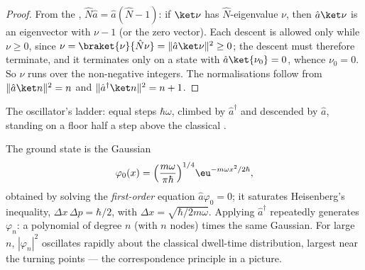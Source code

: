 \begin{proof}
From the , $\hat N\hat a = \hat a(\hat N - 1)$: if
$\ket\nu$ has $\hat N$-eigenvalue $\nu$, then $\hat a\ket\nu$ is an
eigenvector with $\nu - 1$ (or the zero vector). Each descent is
allowed only while $\nu \ge 0$, since $\nu = \braket{\nu}{\hat
N\nu} = \|\hat a\ket\nu\|^2 \ge 0$; the descent must therefore
terminate, and it terminates only on a state with $\hat a\ket{\nu_0}
= 0$, whence $\nu_0 = 0$. So $\nu$ runs over the non-negative
integers. The normalisations follow from $\|\hat a\ket n\|^2 = n$
and $\|\hat a^\dagger\ket n\|^2 = n + 1$.
\end{proof}

\begin{omfigure}

{\small The oscillator's ladder: equal steps $\hbar\omega$, climbed
by $\hat a^\dagger$ and descended by $\hat a$, standing on a floor
half a step above the classical .}
\end{omfigure}

\begin{proposition}\label{prop:b3:harmonic-oscillator:wavefunctions}
The ground state is the Gaussian
\[
\varphi_0(x) = \Big(\frac{m\omega}{\pi\hbar}\Big)^{1/4}
\eu^{-m\omega x^2/2\hbar} ,
\]
obtained by solving the \emph{first-order} equation $\hat a\varphi_0
= 0$; it saturates Heisenberg's inequality, $\Delta x\,\Delta p =
\hbar/2$, with $\Delta x = \sqrt{\hbar/2m\omega}$. Applying
$\hat a^\dagger$ repeatedly generates $\varphi_n$: a polynomial of
degree $n$ (with $n$ nodes) times the same Gaussian. For large $n$,
$|\varphi_n|^2$ oscillates rapidly about the classical dwell-time
distribution, largest near the turning points --- the correspondence
principle in a picture.
\end{proposition}

